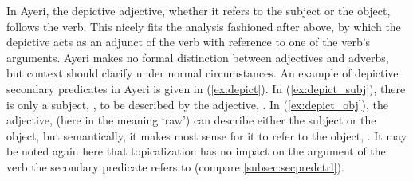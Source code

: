 In Ayeri, the depictive adjective, whether it refers to the subject or the
object, follows the verb. This nicely fits the analysis fashioned after
\citet{mueller2002} above, by which the depictive acts as an adjunct of the
verb with reference to one of the verb's arguments. Ayeri makes no formal
distinction between adjectives and adverbs, but context should clarify under
normal circumstances. An example of depictive secondary predicates in Ayeri is
given in (\ref{ex:depict}). In (\ref{ex:depict_subj}), there is only a subject,
, to be described by the adjective, . In
(\ref{ex:depict_obj}), the adjective,  (here in the
meaning `raw') can describe either the subject or the object, but semantically,
it makes most sense for it to refer to the object, . It
may be noted again here that topicalization has no impact on the argument of
the verb the secondary predicate refers to (compare 
\autoref{subsec:secpredctrl}).

